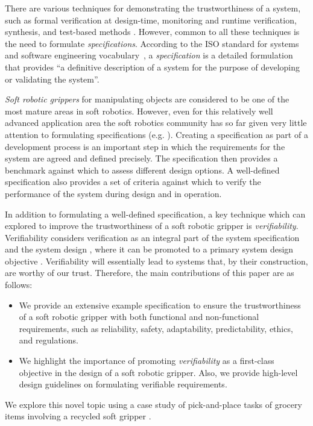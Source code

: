 \documentclass[letterpaper, 10 pt, conference]{ieeeconf}  %
\begin{document}
	There are various techniques for demonstrating the trustworthiness of a system, such as formal verification at design-time, monitoring and runtime verification, synthesis, and test-based methods \cite{Abeywickrama2022}. 
	However, common to all these techniques is the need to formulate \emph{specifications}. According to the ISO standard for systems and software engineering vocabulary~\cite{ISO24765:2017}, a \emph{specification} is a detailed formulation that provides ``a definitive description of a system for the purpose of developing or validating the system''. 
	
	\emph{Soft robotic grippers} for manipulating objects are considered to be one of the most mature areas in soft robotics. 
	However, even for this relatively well advanced application area the soft robotics community has so far given very little attention to formulating specifications (e.g. \cite{Shi2023,Cheng2021,Liu2021,Chen2018,Cai2021,Hwang2020,Shin2021}).  Creating a specification as part of a development process is an important step in which the requirements for the system are agreed and defined precisely. %
	The specification then provides a benchmark against which to assess different design options. A well-defined specification also provides a set of criteria against which to verify the performance of the system during design and in operation.
	
	In addition to formulating a well-defined specification, a key technique which can explored to improve the trustworthiness of a soft robotic gripper is \emph{verifiability}. %
	Verifiability considers verification as an integral part of the system specification and the system design \cite{Mousavi2022}, where it can be promoted to a primary system design objective \cite{Eder2021}. 
	Verifiability will essentially lead to systems that, by their construction, are worthy of our trust. 
	Therefore, the main contributions of this paper are as follows:
	\begin{itemize}
		\item We provide an extensive example specification to ensure the trustworthiness of a soft robotic gripper \cite{Partridge2022} with both functional and non-functional requirements, such as reliability, safety, adaptability, predictability, ethics, and regulations.
		\item We highlight the importance of promoting \emph{verifiability} as a first-class objective in the design of a soft robotic gripper. Also, we provide high-level design guidelines on formulating verifiable requirements. 
	\end{itemize}
	We explore this novel topic using a case study of pick-and-place tasks of grocery items \cite{Triantafyllou2019, Sotiropoulos2018} involving a recycled soft gripper \cite{Partridge2022}. 
	
\end{document}
